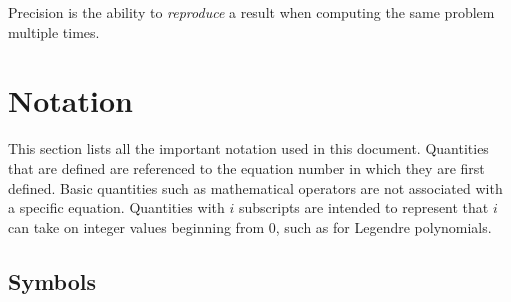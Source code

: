 \documentclass[10pt]{article}
\begin{document}
\begin{flushleft}
Precision is the ability to \textit{reproduce} a result when computing the same problem multiple times. 










\section{Notation}

This section lists all the important notation used in this document. Quantities that are defined are referenced to the equation number in which they are first defined. Basic quantities such as mathematical operators are not associated with a specific equation. Quantities with \(i\) subscripts are intended to represent that \(i\) can take on integer values beginning from \(0\), such as for Legendre polynomials.

\subsection{Symbols}


\end{flushleft}
\end{document}
